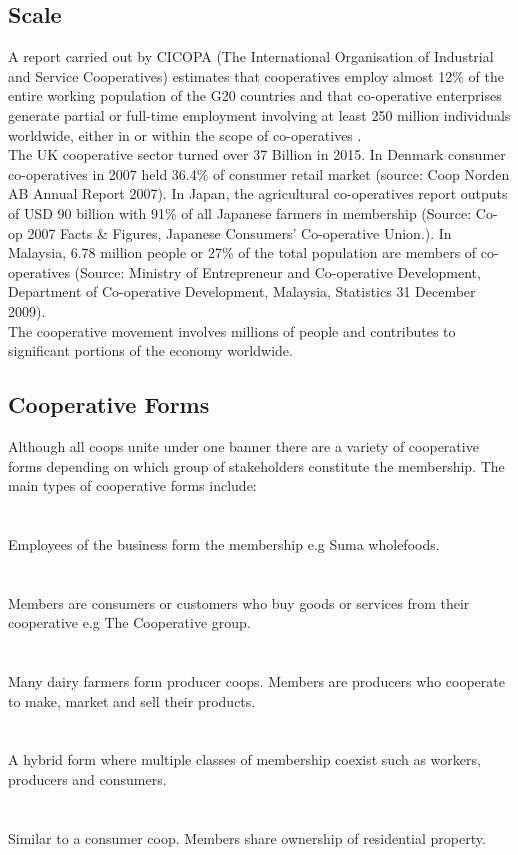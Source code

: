 \subsection{Scale}
A report carried out by CICOPA (The International Organisation of Industrial and Service Cooperatives) estimates that cooperatives employ almost 12\% of the entire working population of the G20 countries and that co-operative enterprises generate partial or full-time employment involving at least 250 million individuals worldwide, either in or within the scope of co-operatives \cite{roelants2014cooperatives}.\\

The UK cooperative sector turned over 37 Billion in 2015\cite{Cooperative_economy}. In Denmark consumer co-operatives in 2007 held 36.4\% of consumer retail market (source: Coop Norden AB Annual Report 2007). In Japan, the agricultural co-operatives report outputs of USD 90 billion with 91\% of all Japanese farmers in membership (Source: Co-op 2007 Facts \& Figures, Japanese Consumers' Co-operative Union.). In Malaysia, 6.78 million people or 27\% of the total population are members of co-operatives (Source: Ministry of Entrepreneur and Co-operative Development, Department of Co-operative Development, Malaysia, Statistics 31 December 2009).\\

The cooperative movement involves millions of people and contributes to significant portions of the economy worldwide.\\

\subsection{Cooperative Forms}
Although all coops unite under one banner there are a variety of cooperative forms depending on which group of stakeholders constitute the membership. The main types of cooperative forms include:\\\\
\\
Employees of the business form the membership e.g Suma wholefoods\cite{Suma}.\\\\
\\
Members are consumers or customers who buy goods or services from their cooperative e.g The Cooperative group\cite{TheCoop}.\\\\
\\
Many dairy farmers form producer coops. Members are producers who cooperate to make, market and sell their products.\\\\
\\
A hybrid form where multiple classes of membership coexist such as workers, producers and consumers.\\\\
\\
Similar to a consumer coop. Members share ownership of residential property. \\


